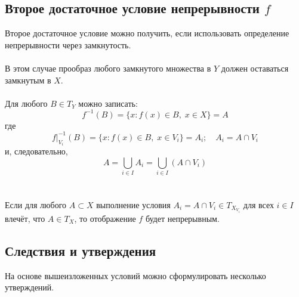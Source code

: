 \documentclass{article}
\begin{document}
        \subsection*{Второе достаточное условие непрерывности \( f \)}
        
        Второе достаточное условие можно получить, если использовать определение непрерывности через замкнутость.\\ \\ В этом случае прообраз любого замкнутого множества в \( Y \) должен оставаться замкнутым в \( X \). \\ \\
        Для любого \( B \in T_Y \) можно записать:
        \[
        f^{-1}(B) = \{ x : f(x) \in B, \; x \in X \} = A
        \]
        где
        \[
        f|_{V_i}^{-1}(B) = \{ x : f(x) \in B, \; x \in V_i \} = A_i; \quad A_i = A \cap V_i
        \]
        и, следовательно,
        \[
        A = \bigcup_{i \in I} A_i = \bigcup_{i \in I} (A \cap V_i)
        \] \\ \\ 
        Если для любого \( A \subset X \) выполнение условия \( A_i = A \cap V_i \in T_{X_{V_i}} \) для всех \( i \in I \) влечёт, что \( A \in T_X \), то отображение \( f \) будет непрерывным.
        
        \subsection*{Следствия и утверждения}
        На основе вышеизложенных условий можно сформулировать несколько утверждений.
        
\end{document}

